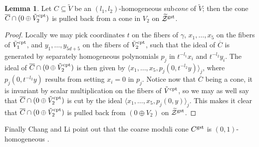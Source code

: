 \documentclass[11pt]{amsart}
\newcommand{\pazocal}{\mathcal}
\newcommand{\Mone}[3]{\overline{\pazocal M}^{(1)}_{1,#1}(#2,#3)}
\newcommand{\tZ}{\widetilde{\pazocal Z}}
\newcommand{\tZp}{\widetilde{\pazocal Z}^p}
\newcommand{\PP}{\mathbb P}
\renewcommand{\to}{\rightarrow}
\newcommand{\Gm}{\mathbb{G}_{\text{m}}}
\newcommand{\R}{\operatorname{R}^{\bullet}}
\newcommand{\hC}{\overline{\mathcal{C}}}
\theoremstyle{definition}
\newtheorem{lem}[thm]{Lemma}
\theoremstyle{definition}
\begin{document}
\begin{lem}
 Let $C\subseteq \tilde V$ be an $(l_1,l_2)$-homogeneous sub\emph{cone} of $\tilde V$; then the cone $\overline{C}\cap(0\oplus\tilde V_2^{\rm{cpt}})$ is pulled back from a cone in $V_2$ on $\tZ^{\rm{gst}}$.
\end{lem}
\begin{proof}
 Locally we may pick coordinates $t$ on the fibers of $\gamma$, $x_1,\ldots,x_5$ on the fibers of $\tilde V_1^{\rm{cpt}}$, and $y_1,\ldots,y_{5d+5}$ on the fibers of $\tilde V_2^{\rm{cpt}}$, such that the ideal of $\overline{C}$ is generated by separately homogeneous polynomials $p_j$ in $t^{-l_1}x_i$ and $t^{-l_2}y_i$. The ideal of $\overline{C}\cap(0\oplus\tilde V_2^{\rm{cpt}})$ is then given by $\langle x_1,\ldots, x_5,p_j(0,t^{-l_2}y)\rangle_j$, where $p_j(0,t^{-l_2}y)$ results from setting $x_i=0$ in $p_j$. Notice now that $\overline{C}$ being a cone, it is invariant by scalar multiplication on the fibers of $\tilde V^{\rm{cpt}}$, so we may as well say that $\overline{C}\cap(0\oplus\tilde V_2^{\rm{cpt}})$ is cut by the ideal $\langle x_1,\ldots, x_5,p_j(0,y)\rangle_j$. This makes it clear that $\overline{C}\cap(0\oplus\tilde V_2^{\rm{cpt}})$ is pulled back from $(0\oplus V_2)$ on $\tZ^{\rm{gst}}$.
\end{proof}

Finally Chang and Li point out that the coarse moduli cone $C^{\rm{gst}}$ is $(0,1)$-homogeneous \cite[Proposition 6.7]{CLpfields}.


 
\end{document}

